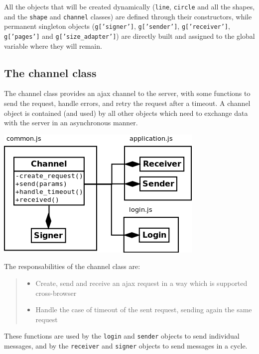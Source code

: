 \documentclass[10pt,a4paper,english]{book}
\begin{document}
All the objects that will be created dynamically (\texttt{line}, \texttt{circle}
and all the shapes, and the \texttt{shape} and \texttt{channel} classes) are
defined through their constructors, while permanent singleton objects
(\texttt{g{[}'signer'{]}}, \texttt{g{[}'sender'{]}}, \texttt{g{[}'receiver'{]}}, \texttt{g{[}'pages'{]}}
and \texttt{g{[}'size{\_}adapter'{]}}) are directly built and assigned to the
global variable where they will remain.



\hypertarget{the-channel-class}{}
\subsection{The channel class}
\label{the-channel-class}

The channel class provides an ajax channel to the server, with some
functions to send the request, handle errors, and retry the request
after a timeout. A channel object is contained (and used) by all other
objects which need to exchange data with the server in an asynchronous
manner.

\includegraphics{images/Channel_use_diagram.png}

The responsabilities of the channel class are:
\begin{quote}
\begin{itemize}
\item {} 
Create, send and receive an ajax request in a way which is
supported cross-browser

\item {} 
Handle the case of timeout of the sent request, sending again the
same request

\end{itemize}
\end{quote}

These functions are used by the \texttt{login} and \texttt{sender} objects to
send individual messages, and by the \texttt{receiver} and \texttt{signer}
objects to send messages in a cycle.
\end{document}
